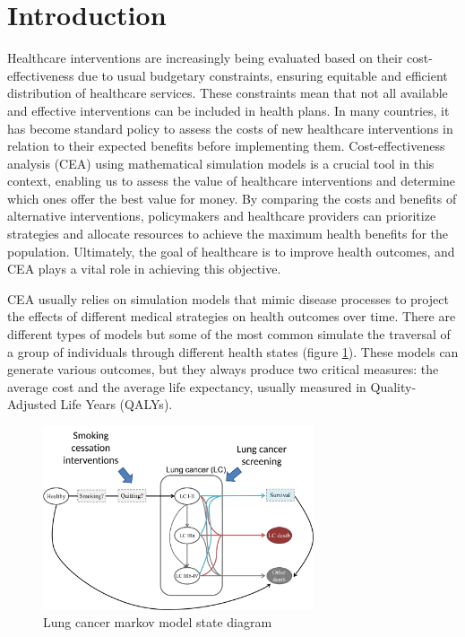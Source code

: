 \documentclass{IOS-Book-Article}
\begin{document}
	\section{Introduction}
	Healthcare interventions are increasingly being evaluated based on their cost-effectiveness due to usual budgetary constraints, ensuring equitable and efficient distribution of healthcare services. These constraints mean that not all available and effective interventions can be included in health plans. In many countries, it has become standard policy to assess the costs of new healthcare interventions in relation to their expected benefits before implementing them. Cost-effectiveness analysis (CEA) using mathematical simulation models is a crucial tool in this context, enabling us to assess the value of healthcare interventions and determine which ones offer the best value for money\cite{drummond}. By comparing the costs and benefits of alternative interventions, policymakers and healthcare providers can prioritize strategies and allocate resources to achieve the maximum health benefits for the population. Ultimately, the goal of healthcare is to improve health outcomes, and CEA plays a vital role in achieving this objective\cite{levin}.
	
	CEA usually relies on simulation models that mimic disease processes to project the effects of different medical strategies on health outcomes over time\cite{applied_he}. There are different types of models but some of the most common simulate the traversal of a group of individuals through different health states (figure \ref{fig:lung_model}). These models can generate various outcomes, but they always produce two critical measures: the average cost and the average life expectancy, usually measured in Quality-Adjusted Life Years (QALYs)\cite{qalys}.
	
	\begin{figure}[h!]
		\centering	
		\includegraphics[width=80mm]{figs/lungmodel.pdf}		
		\caption{Lung cancer markov model state diagram}	
		\label{fig:lung_model}	
	\end{figure}
	
\end{document}
